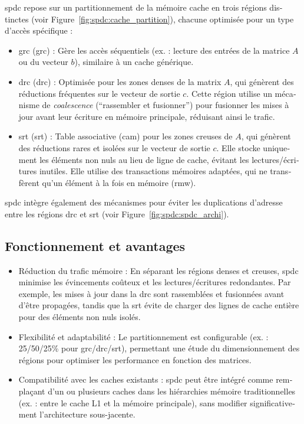 \begin{otherlanguage}{french}
\acrlong{spdc} repose sur un partitionnement de la mémoire cache en trois régions distinctes (voir Figure~\ref{fig:spdc:cache_partition}), chacune optimisée pour un type d'accès spécifique :
\begin{itemize}
    \item \acrshort{grc} (\acrlong{grc}) : Gère les accès séquentiels (ex. : lecture des entrées de la matrice $A$ ou du vecteur $b$), similaire à un cache générique.
    \item \acrshort{drc} (\acrlong{drc}) : Optimisée pour les zones denses de la matrix $A$, qui génèrent des réductions fréquentes sur le vecteur de sortie $c$.
    Cette région utilise un mécanisme de \textit{coalescence} (``rassembler et fusionner'') pour fusionner les mises à jour avant leur écriture en mémoire principale, réduisant ainsi le trafic.
    \item \acrshort{srt} (\acrlong{srt}) : Table associative (\acrshort{cam}) pour les zones creuses de $A$, qui génèrent des réductions rares et isolées sur le vecteur de sortie $c$.
    Elle stocke uniquement les éléments non nuls au lieu de ligne de cache, évitant les lectures/écritures inutiles.
    Elle utilise des transactions mémoires adaptées, qui ne transfèrent qu'un élément à la fois en mémoire (\acrshort{rmw}).
\end{itemize}
\acrlong{spdc} intègre également des mécanismes pour éviter les duplications d'adresse entre les régions \acrshort{drc} et \acrshort{srt} (voir Figure~\ref{fig:spdc:spdc_archi}).

\subsection*{Fonctionnement et avantages}

\begin{itemize}
    \item Réduction du trafic mémoire : En séparant les régions denses et creuses, \acrlong{spdc} minimise les évincements coûteux et les lectures/écritures redondantes.
    Par exemple, les mises à jour dans la \acrshort{drc} sont rassemblées et fusionnées avant d'être propagées, tandis que la \acrshort{srt} évite de charger des lignes de cache entière pour des éléments non nuls isolés.
    \item Flexibilité et adaptabilité : Le partitionnement est configurable (ex. : 25/50/25\% pour \acrshort{grc}/\acrshort{drc}/\acrshort{srt}), permettant une étude du dimensionnement des régions pour optimiser les performance en fonction des matrices.
    \item Compatibilité avec les caches existants : \acrlong{spdc} peut être intégré comme remplaçant d'un ou plusieurs caches dans les hiérarchies mémoire traditionnelles (ex. : entre le cache L1 et la mémoire principale), sans modifier significativement l'architecture sous-jacente.
\end{itemize}


\end{otherlanguage}
